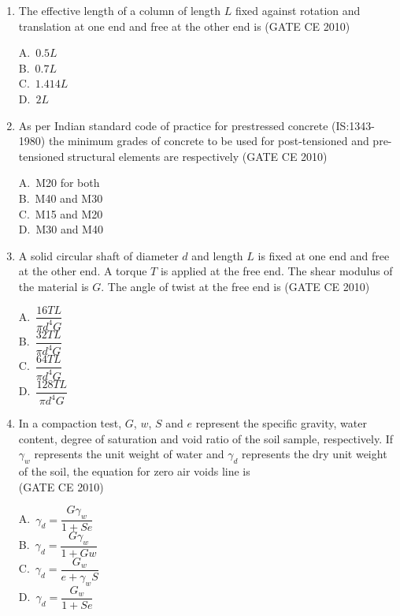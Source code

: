 \documentclass[journal,12pt,onecolumn]{exam}
\theoremstyle{remark}
\begin{document}
\begin{enumerate}
\noindent\item The effective length of a column of length $L$ fixed against rotation and translation at one end and free at the other end is \hfill{(GATE CE 2010)}
\begin{multicols}{4}
A.\ $0.5L$ \\
B.\ $0.7L$ \\
C.\ $1.414L$ \\
D.\ $2L$
\end{multicols}

\raggedright
\noindent\item As per Indian standard code of practice for prestressed concrete (IS:1343-1980) the minimum grades of concrete to be used for post-tensioned and pre-tensioned structural elements are respectively 
\hfill{(GATE CE 2010)}
\begin{multicols}{4}
A.\ M20 for both \\
B.\ M40 and M30 \\
C.\ M15 and M20 \\
D.\ M30 and M40
\end{multicols}

\noindent\item A solid circular shaft of diameter $d$ and length $L$ is fixed at one end and free at the other end. A torque $T$ is applied at the free end. The shear modulus of the material is $G$. The angle of twist at the free end is 
\hfill{(GATE CE 2010)}
\begin{multicols}{4}
A.\ $\dfrac{16TL}{\pi d^4 G}$ \\
B.\ $\dfrac{32TL}{\pi d^4 G}$ \\
C.\ $\dfrac{64TL}{\pi d^4 G}$ \\
D.\ $\dfrac{128TL}{\pi d^4 G}$
\end{multicols}

\noindent\item In a compaction test, $G$, $w$, $S$ and $e$ represent the specific gravity, water content, degree of saturation and void ratio of the soil sample, respectively. If $\gamma_w$ represents the unit weight of water and $\gamma_d$ represents the dry unit weight of the soil, the equation for zero air voids line is 
\\ \hfill{(GATE CE 2010)}
\begin{multicols}{4}
A.\ $\gamma_d = \dfrac{G \gamma_w}{1+Se}$ \\
B.\ $\gamma_d = \dfrac{G \gamma_w}{1+Gw}$ \\
C.\ $\gamma_d = \dfrac{G_w}{e+\gamma_w S}$ \\
D.\ $\gamma_d = \dfrac{G_w}{1+Se}$
\end{multicols}


\end{enumerate}
\end{document}
